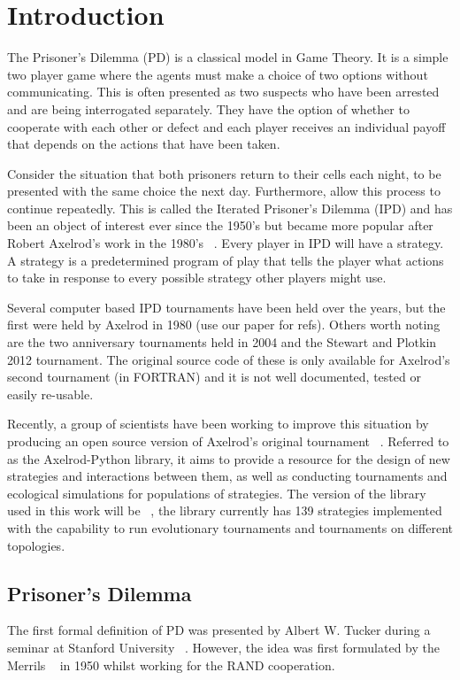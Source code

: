 
\chapter{Introduction}\label{cha:introduction}

The Prisoner's Dilemma (PD) is a classical model in Game Theory.
It is a simple two player game where the agents must make a choice of two options without communicating.
This is often presented as two suspects who have been arrested and are being interrogated separately.
They have the option of whether to cooperate with each other or defect and each player receives an individual payoff that depends on the actions that have been taken.

Consider the situation that both prisoners return to their cells each night, to be presented with the same choice the next day.
Furthermore, allow this process to continue repeatedly.
This is called the Iterated Prisoner's Dilemma (IPD) and has been an object of interest ever since the 1950's but became more popular after Robert Axelrod's work in the 1980's ~\cite{Axelrod2016}.
Every player in IPD will have a strategy.
A strategy is a predetermined program of play that tells the player what actions to take in response to every possible strategy other players might use.

Several computer based IPD tournaments have been held over the years, but the first were held by Axelrod in 1980 (use our paper for refs). %
Others worth noting are the two anniversary tournaments  held in 2004 and the Stewart and Plotkin 2012 tournament.
The original source code of these is only available for Axelrod's second tournament (in FORTRAN) and it is not well documented, tested or easily re-usable.

Recently, a group of scientists have been working to improve this situation by producing an open source version of Axelrod's original tournament ~\cite{Knight2016}.
Referred to as the Axelrod-Python library, it aims to provide a resource for the design of new strategies and interactions between them, as well as conducting tournaments and ecological simulations for populations of strategies.
The version of the library used in this work will be ~\cite{axelrodproject}, the library currently has 139 strategies implemented with the capability to run evolutionary tournaments and tournaments on different topologies.

\section{Prisoner's Dilemma}
The first formal definition of PD was presented by Albert W. Tucker during a seminar at Stanford University ~\cite{Gass2005}.
However, the idea was first formulated by the Merrils ~\cite{Flood1958} in 1950 whilst working for the RAND cooperation.

